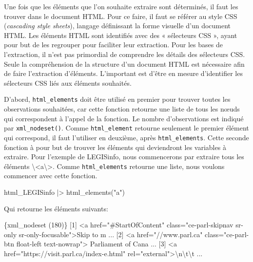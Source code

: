 \documentclass[
  letterpaper,
  DIV=11,
  numbers=noendperiod,
  oneside]{scrreprt}
\newenvironment{Shaded}{\begin{snugshade}}{\end{snugshade}}
\newcommand{\DataTypeTok}[1]{\textcolor[rgb]{0.68,0.00,0.00}{#1}}
\newcommand{\ErrorTok}[1]{\textcolor[rgb]{0.68,0.00,0.00}{#1}}
\newcommand{\ExtensionTok}[1]{\textcolor[rgb]{0.00,0.23,0.31}{#1}}
\newcommand{\KeywordTok}[1]{\textcolor[rgb]{0.00,0.23,0.31}{#1}}
\newcommand{\NormalTok}[1]{\textcolor[rgb]{0.00,0.23,0.31}{#1}}
\newcommand{\OperatorTok}[1]{\textcolor[rgb]{0.37,0.37,0.37}{#1}}
\newcommand{\StringTok}[1]{\textcolor[rgb]{0.13,0.47,0.30}{#1}}
\begin{document}
Une fois que les éléments que l'on souhaite extraire sont déterminés, il
faut les trouver dans le document HTML. Pour ce faire, il faut se
référer au style CSS (\emph{cascading style sheets}), langage
définissant la forme visuelle d'un document HTML. Les éléments HTML sont
identifiés avec des « sélecteurs CSS », ayant pour but de les regrouper
pour faciliter leur extraction. Pour les bases de l'extraction, il n'est
pas primordial de comprendre les détails des sélecteurs CSS. Seule la
compréhension de la structure d'un document HTML est nécessaire afin de
faire l'extraction d'éléments. L'important est d'être en mesure
d'identifier les sélecteurs CSS liés aux éléments souhaités.

D'abord, \texttt{html\_elements} doit être utilisé en premier pour
trouver toutes les observations souhaitées, car cette fonction retourne
une liste de tous les nœuds qui correspondent à l'appel de la fonction.
Le nombre d'observations est indiqué par \texttt{xml\_nodeset()}. Comme
\texttt{html\_element} retourne seulement le premier élément qui
correspond, il faut l'utiliser en deuxième, après
\texttt{html\_elements}. Cette seconde fonction à pour but de trouver
les éléments qui deviendront les variables à extraire. Pour l'exemple de
LEGISinfo, nous commencerons par extraire tous les éléments
\textbackslash\textless a\textbackslash\textgreater. Comme
\texttt{html\_elements} retourne une liste, nous voulons commencer avec
cette fonction.

\begin{Shaded}
\begin{Highlighting}[]
\ExtensionTok{html\_LEGISinfo} \KeywordTok{|}\OperatorTok{\textgreater{}}\NormalTok{ html\_elements}\KeywordTok{(}\StringTok{"a"}\KeywordTok{)}
\end{Highlighting}
\end{Shaded}

Qui retourne les éléments suivants:

\begin{Shaded}
\begin{Highlighting}[]
\ExtensionTok{\{xml\_nodeset} \ErrorTok{(}\ExtensionTok{180}\KeywordTok{)}\ErrorTok{\}}
 \ExtensionTok{[1]} \OperatorTok{\textless{}}\NormalTok{a href=}\StringTok{"\#StartOfContent"}\NormalTok{ class=}\StringTok{"ce{-}parl{-}skipnav sr{-}only }
\StringTok{ sr{-}only{-}focusable"}\OperatorTok{\textgreater{}}\NormalTok{Skip to m ...}
 \ExtensionTok{[2]} \OperatorTok{\textless{}}\NormalTok{a href=}\StringTok{"//www.parl.ca"}\NormalTok{ class=}\StringTok{"ce{-}parl{-}btn float{-}left text{-}nowrap"}\OperatorTok{\textgreater{}}
 \ExtensionTok{Parliament}\NormalTok{ of Cana ...}
 \ExtensionTok{[3]} \OperatorTok{\textless{}}\NormalTok{a href=}\StringTok{"https://visit.parl.ca/index{-}e.html"}\NormalTok{ rel=}\StringTok{"external"}\OperatorTok{\textgreater{}}\DataTypeTok{\textbackslash{}n\textbackslash{}t\textbackslash{}t}\NormalTok{                    ...}
\end{Highlighting}
\end{Shaded}
\end{document}
